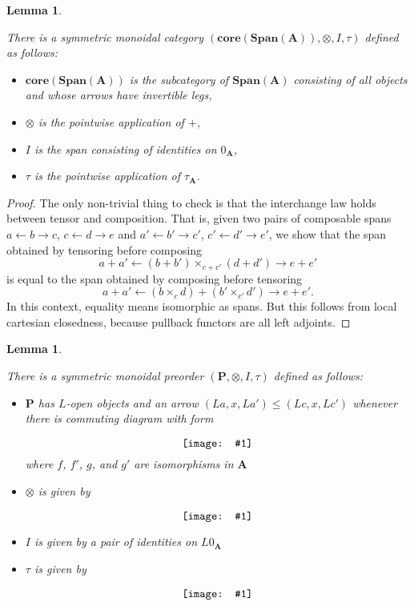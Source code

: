 \documentclass{amsart}
\newcommand{\A}{\cat{A}}
\renewcommand{\P}{\cat{P}}
\newcommand{\core}{\mathbf{core}}
\newcommand{\cat}[1]{\mathbf{#1}}
\newcommand{\diagram}[1]{\raisebox{-0.5\height}{\texttt{[image: \#1]}}}
\newcommand{\Span}{\mathbf{Span}}
\newtheorem{lemma}[theorem]{Lemma}
\theoremstyle{remark}
\theoremstyle{definition}
\begin{document}
\begin{lemma} \label{thm_dbl-rewr-obcat}

  There is a symmetric monoidal category
  $ ( \core (\Span (\A)) , \otimes , I , \tau ) $ defined as follows:

  \begin{itemize}
    \item $ \core (\Span (\A)) $ is the subcategory of $ \Span (\A) $
      consisting of all objects and whose arrows have invertible legs,
    \item $ \otimes $ is the pointwise application of $ + $,
    \item $ I $ is the span consisting of identities on $ 0_{\A} $,
    \item $ \tau $ is the pointwise application of $ \tau_{\A} $.
  \end{itemize}
    
\end{lemma}

\begin{proof}
  
  The only non-trivial thing to check is that the interchange law
  holds between tensor and composition.  That is, given two pairs of
  composable spans $ a \gets b \to c $, $ c \gets d \to e $ and
  $ a' \gets b' \to c' $, $ c' \gets d' \to e' $, we show that the
  span obtained by tensoring before composing
  \[
    a + a' \gets (b + b') \times_{c + c'} (d + d') \to e + e'
  \]
  is equal to the span obtained by composing before tensoring
  \[
    a + a' \gets (b \times_{c} d) + (b' \times_{c'} d') \to e + e'.
  \]
  In this context, equality means isomorphic as spans. But this
  follows from local cartesian closedness, because pullback functors
  are all left adjoints.
  
\end{proof}

\begin{lemma}
  \label{thm:dlb-rewr-arrcat}

  There is a symmetric monoidal preorder
  $ (\P , \otimes , I , \tau ) $ defined as follows:
  
  \begin{itemize}
  \item $ \P $ has $ L $-open objects and an arrow
    $ ( La , x , La') \leq ( Lc , x , Lc') $ whenever
    there is commuting diagram with form
    \[
      \diagram{diag_nlr_dbl-rewrite-2cell}
    \]
    where $ f $, $ f' $, $ g $, and $ g' $ are isomorphisms in $ \A $
   \item $ \otimes $ is given by
       \[
         \diagram{diag_nlr_dbl-rewrite-tensor}
       \]
   \item $ I $ is given by a pair of identities on $ L0_{\A} $
   \item $ \tau $ is given by
     \[
	\diagram{diag_nlr_dbl-rewrite-braiding}
     \]
   \end{itemize}
    
\end{lemma}
  
\end{document}
